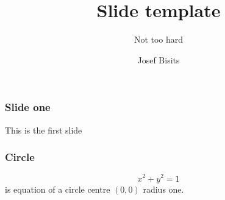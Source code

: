 \documentclass[aspectratio=169]{beamer}
\title{Slide template}
\subtitle{Not too hard}
\author[Bisits, Josef]{Josef Bisits}
\institute[School of Mathematics and Statistics, UNSW]{School of Mathematics and Statistics}
\begin{document}
\begin{frame}
    \titlepage
\end{frame}

\begin{frame}
\frametitle{Slide one}
    This is the first slide
\end{frame}

{
\begin{frame}
\frametitle{Circle}
    \begin{equation}
        x^2 + y^2 = 1
    \end{equation}
    \pause
    is equation of a circle centre $(0,0)$ radius one.
\end{frame}
}
\end{document}
